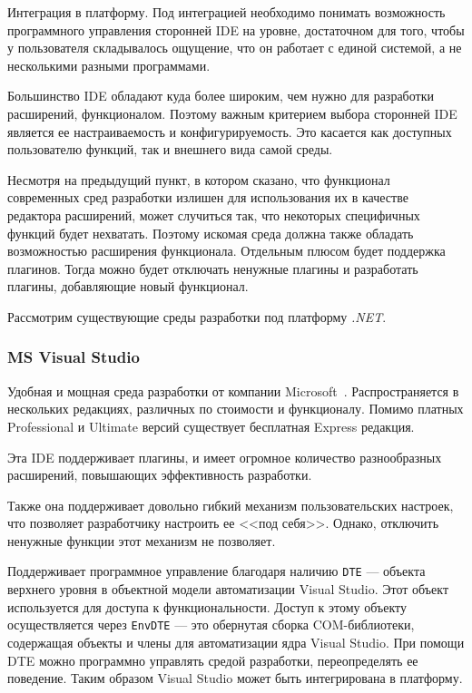 Интеграция в платформу. Под интеграцией необходимо понимать возможность программного управления сторонней IDE на уровне, достаточном для того, чтобы у пользователя складывалось ощущение, что он работает с единой системой, а не несколькими разными программами.

Большинство IDE обладают куда более широким, чем нужно для разработки расширений, функционалом. Поэтому важным критерием выбора сторонней IDE является ее настраиваемость и конфигурируемость. Это касается как доступных пользователю функций, так и внешнего вида самой среды.

Несмотря на предыдущий пункт, в котором сказано, что функционал современных сред разработки излишен для использования их в качестве редактора расширений, может случиться так, что некоторых специфичных функций будет нехватать. Поэтому искомая среда должна также обладать возможностью расширения функционала. Отдельным плюсом будет поддержка плагинов. Тогда можно будет отключать ненужные плагины и разработать плагины, добавляющие новый функционал.

Рассмотрим существующие среды разработки под платформу {\it .NET}.

\subsubsection{MS Visual Studio}

Удобная и мощная среда разработки от компании Microsoft~\cite{vs-website}. Распространяется в нескольких редакциях, различных по стоимости и функционалу. Помимо платных Professional и Ultimate версий существует бесплатная Express редакция.

Эта IDE поддерживает плагины, и имеет огромное количество разнообразных расширений, повышающих эффективность разработки.

Также она поддерживает довольно гибкий механизм пользовательских настроек, что позволяет разработчику настроить ее <<под себя>>. Однако, отключить ненужные функции этот механизм не позволяет.

Поддерживает программное управление благодаря наличию  {\tt DTE} --- объекта верхнего уровня в объектной модели автоматизации Visual Studio. Этот объект используется для доступа к функциональности. Доступ к этому объекту осуществляется через {\tt EnvDTE} --- это обернутая сборка COM-библиотеки, содержащая объекты и члены для автоматизации ядра Visual Studio. При помощи DTE можно программно управлять средой разработки, переопределять ее поведение. Таким образом Visual Studio может быть интегрирована в платформу.

